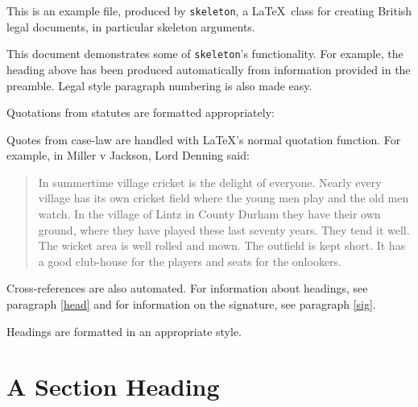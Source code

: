 \documentclass[10pt, oneside, detailedhead]{skeleton}
\date{\today}
\begin{document}
	
	\legalhead
			
	\pa This is an example file, produced by \texttt{skeleton}, a \LaTeX\ class for creating British legal documents, in particular skeleton arguments.
	
	\pa This document demonstrates some of \texttt{skeleton}'s functionality. For example, the heading above has been produced automatically from information provided in the preamble. Legal style paragraph numbering is also made easy.\label{head}

	\pa Quotations from statutes are formatted appropriately:
	
	\begin{statquote}
		\begin{instatquote}
			\end{instatquote}
	\end{statquote}
	
	\pa Quotes from case-law are handled with \LaTeX's normal quotation function. For example, in Miller v Jackson, Lord Denning said:
	
	\begin{quotation}
		In summertime village cricket is the delight of everyone. Nearly every village has its own cricket field where the young men play and the old men watch. In the village of Lintz in County Durham they have their own ground, where they have played these last seventy years. They tend it well. The wicket area is well rolled and mown. The outfield is kept short. It has a good club-house for the players and seats for the onlookers.
	\end{quotation} 

	\pa Cross-references are also automated. For information about headings, see paragraph \ref{head} and for information on the signature, see paragraph \ref{sig}.
	
	\pa Headings are formatted in an appropriate style.
	
	\section{A Section Heading} %
	\label{sec:a_section_heading}
	
\end{document}
